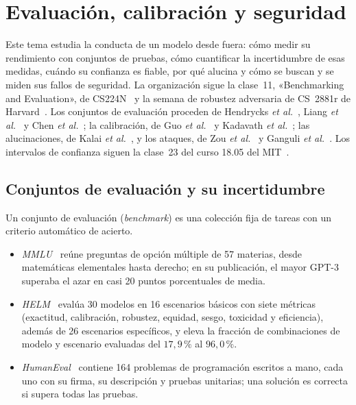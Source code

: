 \chapter{Evaluación, calibración y seguridad}
\label{tema:6}

Este tema estudia la conducta de un modelo desde fuera: cómo medir su rendimiento con conjuntos de pruebas, cómo cuantificar la incertidumbre de esas medidas, cuándo su confianza es fiable, por qué alucina y cómo se buscan y se miden sus fallos de seguridad. La organización sigue la clase~11, «Benchmarking and Evaluation», de CS224N~\cite{cs224n} y la semana de robustez adversaria de CS~2881r de Harvard~\cite{cs2881}. Los conjuntos de evaluación proceden de Hendrycks \emph{et al.}~\cite{hendrycks}, Liang \emph{et al.}~\cite{helm} y Chen \emph{et al.}~\cite{chen}; la calibración, de Guo \emph{et al.}~\cite{guo} y Kadavath \emph{et al.}~\cite{kadavath}; las alucinaciones, de Kalai \emph{et al.}~\cite{kalai25}, y los ataques, de Zou \emph{et al.}~\cite{zou} y Ganguli \emph{et al.}~\cite{ganguli}. Los intervalos de confianza siguen la clase~23 del curso 18.05 del MIT~\cite{mit1805}.

\section{Conjuntos de evaluación y su incertidumbre}

Un conjunto de evaluación (\emph{benchmark}) es una colección fija de tareas con un criterio automático de acierto.
\begin{itemize}[leftmargin=1.4em]
  \item \emph{MMLU}~\cite{hendrycks} reúne preguntas de opción múltiple de 57 materias, desde matemáticas elementales hasta derecho; en su publicación, el mayor GPT-3 superaba el azar en casi 20 puntos porcentuales de media.
  \item \emph{HELM}~\cite{helm} evalúa 30 modelos en 16 escenarios básicos con siete métricas (exactitud, calibración, robustez, equidad, sesgo, toxicidad y eficiencia), además de 26 escenarios específicos, y eleva la fracción de combinaciones de modelo y escenario evaluadas del $17{,}9\,\%$ al $96{,}0\,\%$.
  \item \emph{HumanEval}~\cite{chen} contiene 164 problemas de programación escritos a mano, cada uno con su firma, su descripción y pruebas unitarias; una solución es correcta si supera todas las pruebas.
\end{itemize}

